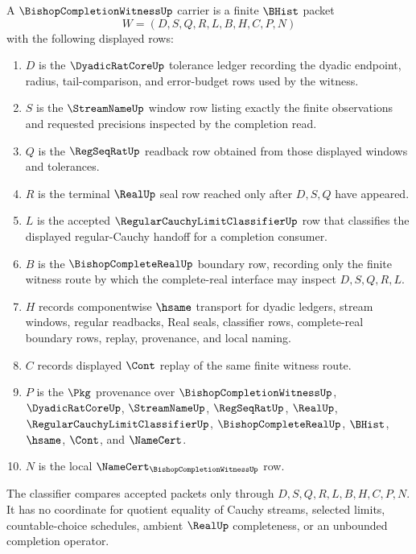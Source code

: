 \begin{definition}
\label{def:bishop-completion-witness-carrier}
A $\BishopCompletionWitnessUp$ carrier is a finite $\BHist$ packet
$$
W=(D,S,Q,R,L,B,H,C,P,N)
$$
with the following displayed rows:
\begin{enumerate}
\item $D$ is the $\DyadicRatCoreUp$ tolerance ledger recording the dyadic endpoint, radius, tail-comparison, and error-budget rows used by the witness.
\item $S$ is the $\StreamNameUp$ window row listing exactly the finite observations and requested precisions inspected by the completion read.
\item $Q$ is the $\RegSeqRatUp$ readback row obtained from those displayed windows and tolerances.
\item $R$ is the terminal $\RealUp$ seal row reached only after $D,S,Q$ have appeared.
\item $L$ is the accepted $\RegularCauchyLimitClassifierUp$ row that classifies the displayed regular-Cauchy handoff for a completion consumer.
\item $B$ is the $\BishopCompleteRealUp$ boundary row, recording only the finite witness route by which the complete-real interface may inspect $D,S,Q,R,L$.
\item $H$ records componentwise $\hsame$ transport for dyadic ledgers, stream windows, regular readbacks, Real seals, classifier rows, complete-real boundary rows, replay, provenance, and local naming.
\item $C$ records displayed $\Cont$ replay of the same finite witness route.
\item $P$ is the $\Pkg$ provenance over $\BishopCompletionWitnessUp$, $\DyadicRatCoreUp$, $\StreamNameUp$, $\RegSeqRatUp$, $\RealUp$, $\RegularCauchyLimitClassifierUp$, $\BishopCompleteRealUp$, $\BHist$, $\hsame$, $\Cont$, and $\NameCert$.
\item $N$ is the local $\NameCert_{\BishopCompletionWitnessUp}$ row.
\end{enumerate}
The classifier compares accepted packets only through $D,S,Q,R,L,B,H,C,P,N$. It has no coordinate for quotient equality of Cauchy streams, selected limits, countable-choice schedules, ambient $\RealUp$ completeness, or an unbounded completion operator.
\end{definition}

